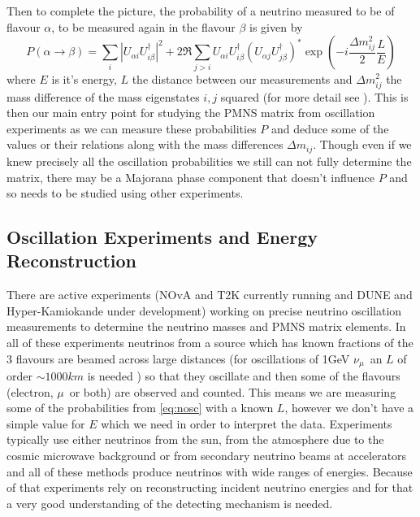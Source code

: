 \documentclass[a4paper,12pt]{article}
\newcommand{\Mu}{$\mu$}
\newcommand{\Nm}{$\nu_\mu$}
\begin{document}
Then to complete the picture, the probability of a neutrino measured to be of flavour $\alpha$, to be measured again in the flavour $\beta$ is given by 
\begin{equation} \label{eq:nosc}
    P(\alpha \rightarrow \beta) = \sum_i |U_{\alpha i} U^\dag_{i \beta}|^2 + 2\Re \sum_{j>i} U_{\alpha i} U^\dag_{i \beta} (U_{\alpha j} U^\dag_{j \beta})^* \exp(-i\frac{\Delta m^2_{ij}}{2}\frac{L}{E})
\end{equation}
where $E$ is it's energy, $L$ the distance between our measurements and $\Delta m^2_{ij}$ the mass difference of the mass eigenstates $i, j$ squared (for more detail see \cite{zuberNeutrinoPhysics2020}).
This is then our main entry point for studying the PMNS matrix from oscillation experiments as we can measure these probabilities $P$ and deduce some of the values or their relations along with the mass differences $\Delta m_{ij}$.
Though even if we  knew precisely all the oscillation probabilities we still can not fully determine the matrix, there may be a Majorana phase component that doesn't influence $P$ and so needs to be studied using other experiments.

\subsection{Oscillation Experiments and Energy Reconstruction}\label{sec:exanderec}
There are active experiments (NOvA and T2K currently running and DUNE and Hyper-Kamiokande under development) working on precise neutrino oscillation measurements to determine the neutrino masses and PMNS matrix elements.
In all of these experiments neutrinos from a source which has known fractions of the 3 flavours are beamed across large distances (for oscillations of 1\si{GeV} \Nm\ an $L$ of order $\sim 1000\si{km}$ is needed \cite{mezzettoThreeFlavorOscillationsAccelerator2020}) so that they oscillate and then some of the flavours (electron, \Mu\ or both) are observed and counted.
This means we are measuring some of the probabilities from \cref{eq:nosc} with a known $L$, however we don't have a simple value for $E$ which we need in order to interpret the data.
Experiments typically use either neutrinos from the sun, from the atmosphere due to the cosmic microwave background or from secondary neutrino beams at accelerators and all of these methods produce neutrinos with wide ranges of energies.
Because of that experiments rely on reconstructing incident neutrino energies and for that a very good understanding of the detecting mechanism is needed.
\end{document}
